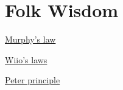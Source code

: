 \section{Folk Wisdom}

\href{https://en.wikipedia.org/wiki/Murphy\%27s_law}{Murphy's law}

\href{https://en.wikipedia.org/wiki/Wiio\%27s_laws}{Wiio's laws}


\href{https://en.wikipedia.org/wiki/Peter_principle}{Peter principle}